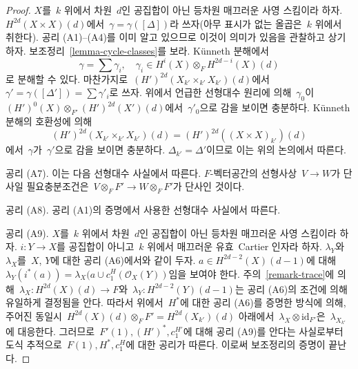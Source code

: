 \begin{proof}
\medskip\noindent
$X$를\  $k$ 위에서 차원\  $d$인 공집합이 아닌 등차원 매끄러운 사영
스킴이라 하자. $H^{2d}(X \times X)(d)$에서\ 
$\gamma = \gamma([\Delta])$라 쓰자(아무 표시가 없는 올곱은\  $k$
위에서 취한다). 공리 (A1)--(A4)를 이미 알고 있으므로 이것이 의미가
있음을 관찰하고 상기하자. 보조정리\  \ref{lemma-cycle-classes}를 보라.
K\"unneth 분해에서
$$
\gamma = \sum \gamma_i, \quad
\gamma_i \in H^i(X) \otimes_F H^{2d - i}(X)(d)
$$
로 분해할 수 있다. 마찬가지로\ 
$(H')^{2d}(X_{k'} \times_{k'} X_{k'})(d)$에서\ 
$\gamma' = \gamma([\Delta']) = \sum \gamma'_i$로 쓰자. 위에서
언급한 선형대수 원리에 의해\  $\gamma_0$이\ 
$(H')^0(X) \otimes_{F'} (H')^{2d}(X')(d)$에서\  $\gamma'_0$으로
감을 보이면 충분하다. K\"unneth 분해의 호환성에 의해
$$
(H')^{2d}(X_{k'} \times_{k'} X_{k'})(d) = (H')^{2d}((X \times X)_{k'})(d)
$$
에서\  $\gamma$가\  $\gamma'$으로 감을 보이면 충분하다.
$\Delta_{k'} = \Delta'$이므로 이는 위의 논의에서 따른다.

\medskip\noindent
공리 (A7). 이는 다음 선형대수 사실에서 따른다. $F$-벡터공간의
선형사상\  $V \to W$가 단사일 필요충분조건은\ 
$V \otimes_F F' \to W \otimes_F F'$가 단사인 것이다.

\medskip\noindent
공리 (A8). 공리 (A1)의 증명에서 사용한 선형대수 사실에서 따른다.

\medskip\noindent
공리 (A9). $X$를\  $k$ 위에서 차원\  $d$인 공집합이 아닌 등차원
매끄러운 사영 스킴이라 하자. $i : Y \to X$를 공집합이 아니고\ 
$k$ 위에서 매끄러운 유효\  Cartier 인자라 하자. $\lambda_Y$와\ 
$\lambda_X$를\  $X$, $Y$에 대한 공리 (A6)에서와 같이 두자.
$a \in H^{2d - 2}(X)(d - 1)$에 대해\ 
$\lambda_Y(i^*(a)) = \lambda_X(a \cup c_1^H(\mathcal{O}_X(Y))$임을
보여야 한다. 주의\  \ref{remark-trace}에 의해\ 
$\lambda_X : H^{2d}(X)(d) \to F$와\ 
$\lambda_Y : H^{2d - 2}(Y)(d - 1)$는 공리 (A6)의 조건에 의해
유일하게 결정됨을 안다. 따라서 위에서\  $H^*$에 대한 공리 (A6)를
증명한 방식에 의해, 주어진 동일시\ 
$H^{2d}(X)(d) \otimes_F F' = H^{2d}(X_{k'})(d)$ 아래에서\ 
$\lambda_X \otimes \text{id}_{F'}$은\  $\lambda_{X_{k'}}$에
대응한다. 그러므로\  $F'(1), (H')^*, c_1^{H'}$에 대해 공리 (A9)를
안다는 사실로부터 도식 추적으로\  $F(1), H^*, c_1^H$에 대한 공리가
따른다. 이로써 보조정리의 증명이 끝난다.
\end{proof}





















